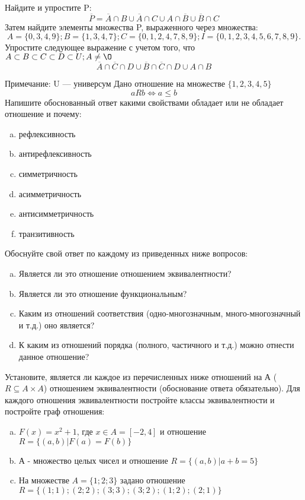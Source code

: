 \documentclass[10pt]{exam}
\begin{document}
\begin{questions}
\question
Найдите и упростите P:
\begin{equation*}
\overline{P} = \overline{A} \cap B \cup \overline{A} \cap C \cup A \cap \overline{B} \cup \overline{B} \cap C
\end{equation*}
Затем найдите элементы множества P, выраженного через множества:
\begin{equation*}
A = \{0, 3, 4, 9\}; 
B = \{1, 3, 4, 7\};
C = \{0, 1, 2, 4, 7, 8, 9\};
I = \{0, 1, 2, 3, 4, 5, 6, 7, 8, 9\}.
\end{equation*}\question
Упростите следующее выражение с учетом того, что $A\subset B \subset C \subset D \subset U; A \neq \O$
\begin{equation*}
\overline{A} \cap \overline{C} \cap D \cup \overline{B} \cap \overline{C} \cap D \cup A \cap B
\end{equation*}

Примечание: U — универсум\question
Дано отношение на множестве $\{1, 2, 3, 4, 5\}$ 
\begin{equation*}
aRb \iff a \leq b
\end{equation*}
Напишите обоснованный ответ какими свойствами обладает или не обладает отношение и почему:   
\begin{enumerate} [a)]\setcounter{enumi}{0}
\item рефлексивность
\item антирефлексивность
\item симметричность
\item асимметричность
\item антисимметричность
\item транзитивность
\end{enumerate}

Обоснуйте свой ответ по каждому из приведенных ниже вопросов:
\begin{enumerate} [a)]\setcounter{enumi}{0}
    \item Является ли это отношение отношением эквивалентности?
    \item Является ли это отношение функциональным?
    \item Каким из отношений соответствия (одно-многозначным, много-многозначный и т.д.) оно является?
    \item К каким из отношений порядка (полного, частичного и т.д.) можно отнести данное отношение?
\end{enumerate}


\question
Установите, является ли каждое из перечисленных ниже отношений на А ($R \subseteq A \times A$) отношением эквивалентности (обоснование ответа обязательно). Для каждого отношения эквивалентности постройте классы эквивалентности и постройте граф отношения:
\begin{enumerate} [a)]\setcounter{enumi}{0}
\item $F(x)=x^{2}+1$, где $x \in A = [-2, 4]$ и отношение $R = \{(a,b)|F(a) = F(b)\}$
\item А - множество целых чисел и отношение $R = \{(a,b)|a + b = 5\}$
\item На множестве $A = \{1; 2; 3\}$ задано отношение $R = \{(1; 1); (2; 2); (3; 3); (3; 2); (1; 2); (2; 1)\}$


\end{enumerate}
\end{questions}
\end{document}
